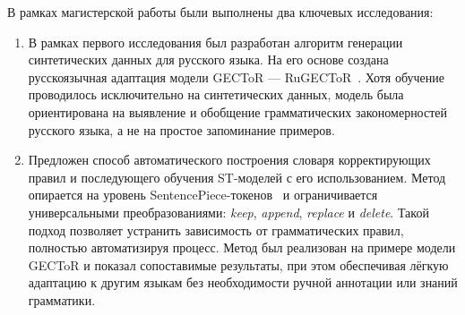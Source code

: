 В рамках магистерской работы были выполнены два ключевых исследования:
\begin{enumerate}
    \item В рамках первого исследования был разработан алгоритм генерации синтетических данных для русского языка. На его основе создана русскоязычная адаптация модели GECToR — RuGECToR~\cite{b21}. Хотя обучение проводилось исключительно на синтетических данных, модель была ориентирована на выявление и обобщение грамматических закономерностей русского языка, а не на простое запоминание примеров.
    \item Предложен способ автоматического построения словаря корректирующих правил и последующего обучения ST-моделей с его использованием. Метод опирается на уровень SentencePiece-токенов~\cite{b22} и ограничивается универсальными преобразованиями: \textit{keep}, \textit{append}, \textit{replace} и \textit{delete}. Такой подход позволяет устранить зависимость от грамматических правил, полностью автоматизируя процесс. Метод был реализован на примере модели GECToR и показал сопоставимые результаты, при этом обеспечивая лёгкую адаптацию к другим языкам без необходимости ручной аннотации или знаний грамматики.
\end{enumerate}

